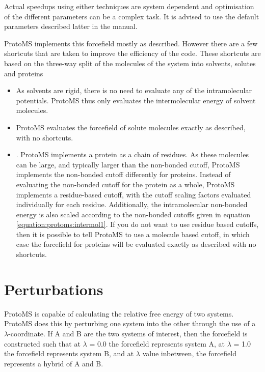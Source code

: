 \documentclass[letterpaper,10pt,english]{sphinxmanual}
\begin{document}
Actual speedups using either techniques are system dependent and optimisation of the different parameters can be a complex task. It is advised to use the default parameters described latter in the manual.


ProtoMS implements this forcefield mostly as described. However there are a few shortcuts that are taken to improve the efficiency of the code. These shortcuts are based on the three-way split of the molecules of the system into solvents, solutes and proteins
\begin{itemize}
\item {} 
 As solvents are rigid, there is no need to evaluate any of the intramolecular potentials. ProtoMS thus only evaluates the intermolecular energy of solvent molecules.

\item {} 
 ProtoMS evaluates the forcefield of solute molecules exactly as described, with no shortcuts.

\item {} 
. ProtoMS implements a protein as a chain of residues. As these molecules can be large, and typically larger than the non-bonded cutoff, ProtoMS implements the non-bonded cutoff differently for proteins. Instead of evaluating the non-bonded cutoff for the protein as a whole, ProtoMS implements a residue-based cutoff, with the cutoff scaling factors evaluated individually for each residue. Additionally, the intramolecular non-bonded energy is also scaled according to the non-bonded cutoffs given in equation \eqref{equation:protoms:intermol1}. If you do not want to use residue based cutoffs, then it is possible to tell ProtoMS to use a molecule based cutoff, in which case the forcefield for proteins will be evaluated exactly as described with no shortcuts.

\end{itemize}

\ignorespaces 

\section{Perturbations}
\label{\detokenize{protoms:perturbations}}\label{\detokenize{protoms:index-14}}
ProtoMS is capable of calculating the relative free energy of two systems. ProtoMS does this by perturbing one system into the other through the use of a \(\lambda\)-coordinate. If A and B are the two systems of interest, then the forcefield is constructed such that at \(\lambda\) = 0.0 the forcefield represents system A, at \(\lambda\) = 1.0 the forcefield represents system B, and at \(\lambda\) value inbetween, the forcefield represents a hybrid of A and B.
\end{document}
